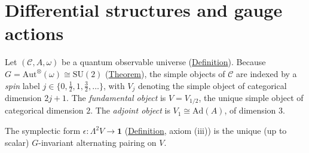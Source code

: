 \section{Differential structures and gauge actions}
\label{sec:differential-structures}

\begin{definition}
  \label{def:spin-labels}
Let $(\mathcal{C}, A, \omega)$ be a quantum observable universe
(\hyperref[def:quantum-observable-universe]{Definition}). Because
$G = \mathrm{Aut}^{\otimes}(\omega) \cong \mathrm{SU}(2)$
(\hyperref[thm:su2-emergence]{Theorem}), the simple objects of $\mathcal{C}$
are indexed by a \emph{spin} label $j \in \{0, \tfrac12, 1,
\tfrac32, \ldots\}$, with $V_j$ denoting the simple object of
categorical dimension $2j + 1$.
The \emph{fundamental object} is $V = V_{1/2}$, the unique simple object
of categorical dimension $2$. The \emph{adjoint object} is
$V_1 \cong \mathrm{Ad}(A)$, of dimension $3$.

The symplectic form $\epsilon \colon \Lambda^2 V \to \mathbf{1}$
(\hyperref[def:quantum-observable-universe]{Definition}, axiom (iii)) is the
unique (up to scalar) $G$-invariant alternating pairing on $V$.
\end{definition}


